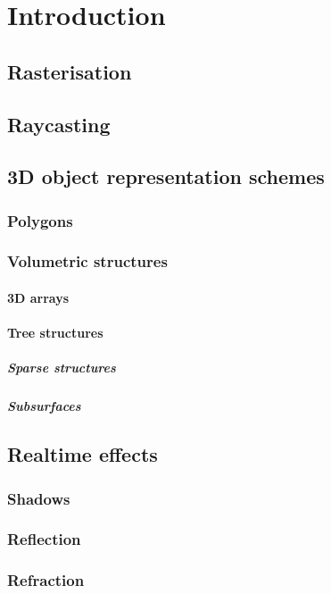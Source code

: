 \chapter{Introduction}
\label{intro}

\section{Rasterisation}

\section{Raycasting}

\section{3D object representation schemes}

\subsection{Polygons}

\subsection{Volumetric structures}

\subsubsection{3D arrays}

\subsubsection{Tree structures}

\paragraph{Sparse structures}


\paragraph{Subsurfaces}


\section{Realtime effects}

\subsection{Shadows}

\subsection{Reflection}

\subsection{Refraction}